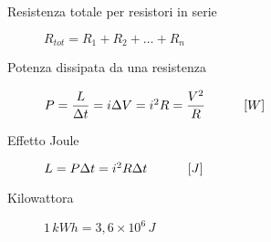 \documentclass[a4paper,11pt,italian]{article}
\begin{document}
\begin{description}
  \item[Resistenza totale per resistori in serie] 
  $ R_{tot} = R_1 + R_2 + \ldots + R_n $
%

%   
  \item[Potenza dissipata da una resistenza]
  $ P = \dfrac{L}{\Delta t} = i \Delta V = i^2 R = \dfrac{V^2}{R} \hspace*{3em} [W] $
  
  \item[Effetto Joule] 
  $ L = P \Delta t = i^2 R \Delta t \hspace*{3em} \left[ J \right] $
  
  \item[Kilowattora] 
  $ 1 \, kWh = 3,6 \times 10^6 \, J $
  
  

\end{description}
\end{document}
